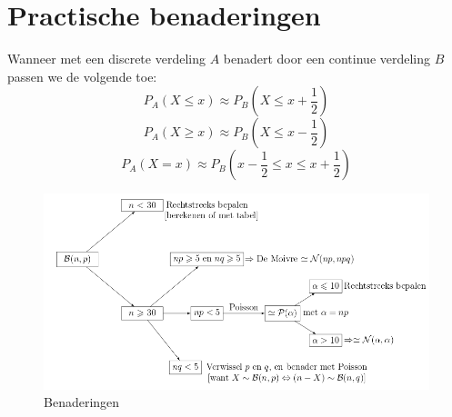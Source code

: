 \documentclass[main.tex]{subfiles}
\begin{document}
\section{Practische benaderingen}
\label{sec:pract-benad}

\begin{de}
  Wanneer met een discrete verdeling $A$ benadert door een continue verdeling $B$ passen we de volgende  toe:
  \[ P_{A}(X\le x) \approx P_{B}\left(X \le x+\frac{1}{2}\right)\]
  \[ P_{A}(X\ge x) \approx P_{B}\left(X \le x-\frac{1}{2}\right)\]
  \[ P_{A}(X=x) \approx P_{B}\left(x-\frac{1}{2} \le x \le x+\frac{1}{2}\right) \]
\end{de}

\begin{figure}[H]
  \caption{Benaderingen}
  \centering
    \includegraphics[width=\textwidth]{assets/benaderingen.png}
\end{figure}
\end{document}

